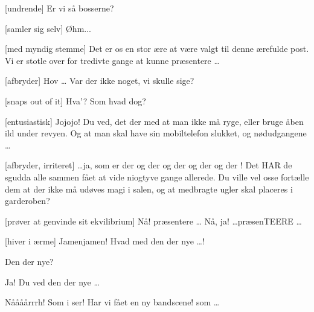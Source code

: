 \documentclass[a4paper,11pt]{article}
\begin{document}
\begin{sketch}
   
  
  
   
  
   
  
   
  
  [undrende] Er vi så bosserne?
  
  [samler sig selv] Øhm... 
  
  [med myndig stemme] Det er os en stor ære at være valgt til
  denne  ærefulde post. Vi er stotle over for tredivte
  gange  at kunne præsentere
  \ldots
  
  [afbryder] Hov \ldots {} Var der ikke
  noget, vi skulle sige?
  
  [snaps out of it] Hva'? Som hvad dog?
  
  [entusiastisk] Jojojo! Du ved, det der med at man
   ikke må ryge, eller bruge åben ild under
  revyen. Og at man skal have sin mobiltelefon slukket, og
  nødudgangene \ldots
  
  [afbryder, irriteret] \ldots ja, som er der og der og der
  og der og der !  Det HAR de sgudda alle sammen fået at vide niogtyve
  gange allerede. Du ville vel osse fortælle dem at der ikke må udøves
  magi i salen, og at medbragte ugler skal placeres i garderoben?
  
  [prøver at genvinde sit ekvilibrium] Nå!  præsentere \ldots {} Nå, ja!  \ldots præsenTEERE \ldots
  
  [hiver i ærme] Jamenjamen! Hvad med den der nye \ldots!
  
   Den der nye?
  
   Ja! Du ved  den der nye \ldots
  
   Nåååårrrh!  Som i ser! Har vi fået en ny
  bandscene! som \ldots
  

\end{sketch}
\end{document}
